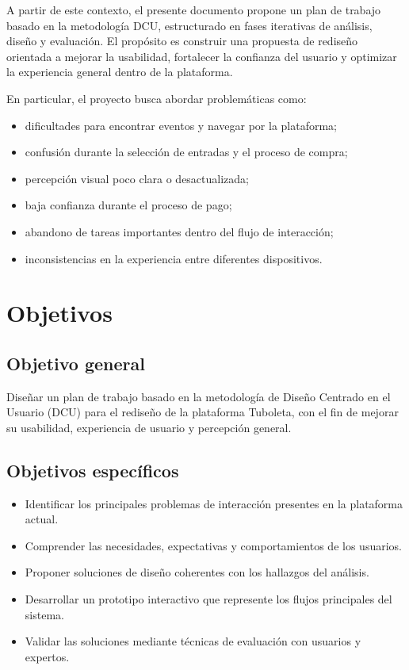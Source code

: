\documentclass[12pt,letterpaper]{article}
\begin{document}
A partir de este contexto, el presente documento propone un plan de trabajo basado en la metodología DCU, estructurado en fases iterativas de análisis, diseño y evaluación. El propósito es construir una propuesta de rediseño orientada a mejorar la usabilidad, fortalecer la confianza del usuario y optimizar la experiencia general dentro de la plataforma.

En particular, el proyecto busca abordar problemáticas como:

\begin{itemize}
    \item dificultades para encontrar eventos y navegar por la plataforma;
    \item confusión durante la selección de entradas y el proceso de compra;
    \item percepción visual poco clara o desactualizada;
    \item baja confianza durante el proceso de pago;
    \item abandono de tareas importantes dentro del flujo de interacción;
    \item inconsistencias en la experiencia entre diferentes dispositivos.
\end{itemize}

\section{Objetivos}

\subsection{Objetivo general}

Diseñar un plan de trabajo basado en la metodología de Diseño Centrado en el Usuario (DCU) para el rediseño de la plataforma Tuboleta, con el fin de mejorar su usabilidad, experiencia de usuario y percepción general.

\subsection{Objetivos específicos}
\begin{itemize}
    \item Identificar los principales problemas de interacción presentes en la plataforma actual.
    \item Comprender las necesidades, expectativas y comportamientos de los usuarios.
    \item Proponer soluciones de diseño coherentes con los hallazgos del análisis.
    \item Desarrollar un prototipo interactivo que represente los flujos principales del sistema.
    \item Validar las soluciones mediante técnicas de evaluación con usuarios y expertos.
\end{itemize}
\end{document}
